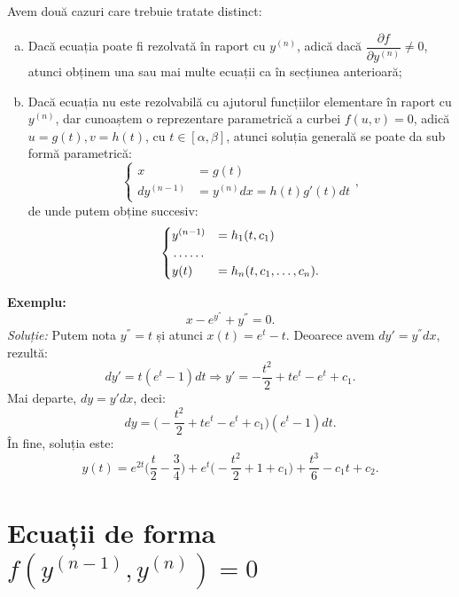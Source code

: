 Avem două cazuri care trebuie tratate distinct:
\begin{enumerate}[(a)]
  \item Dacă ecuația poate fi rezolvată în raport cu $ y^{(n)} $, adică dacă
    $ \dfrac{\partial f}{\partial y^{(n)}} \neq 0 $, atunci obținem una
      sau mai multe ecuații ca în secțiunea anterioară;
    \item Dacă ecuația nu este rezolvabilă cu ajutorul funcțiilor elementare
      în raport cu $ y^{(n)} $, dar cunoaștem o reprezentare parametrică
      a curbei $ f(u, v) = 0 $, adică $ u = g(t), v = h(t) $, cu
      $ t \in [\alpha, \beta] $, atunci soluția generală se poate da sub formă
      parametrică:
      \[
        \begin{cases}
          x &= g(t) \\
          dy^{(n-1)} &= y^{(n)} dx = h(t) g'(t) dt
        \end{cases},
      \]
      de unde putem obține succesiv:
      \[
        \begin{cases}
          y^{(n-1)}  &= h_1(t, c_1) \\
             \dotfill \\
          y(t) &= h_n(t, c_1, \dots, c_n).
        \end{cases}
      \]
\end{enumerate}

\textbf{Exemplu:}
\[
  x - e^{y^{''}} + y^{''} = 0.
\]
\emph{Soluție:} Putem nota $ y^{''} = t $ și atunci $ x(t) = e^t - t $.
Deoarece avem $ dy' = y^{''} dx $, rezultă:
\[
  dy' = t(e^t - 1) dt \Rightarrow y' = -\dfrac{t^2}{2} + te^t - e^t + c_1.
\]
Mai departe, $ dy = y' dx $, deci:
\[
  dy = \Big( - \dfrac{t^2}{2} + te^t - e^t + c_1 \Big)(e^t - 1) dt.
\]
În fine, soluția este:
\[
  y(t) = e^{2t} \Big( \dfrac{t}{2} - \dfrac{3}{4} \Big) + e^t \Big( - \dfrac{t^2}{2} + %
  1 + c_1 \Big) + \dfrac{t^3}{6} - c_1 t + c_2.
\]


\section{Ecuații de forma $ f(y^{(n-1)}, y^{(n)}) = 0 $}

